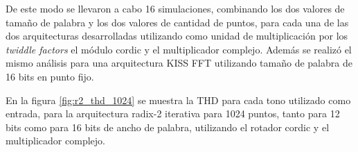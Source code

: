 De este modo se llevaron a cabo 16 simulaciones, combinando los dos valores de tamaño de palabra y
los dos valores de cantidad de puntos, para cada una de las dos arquitecturas desarrolladas
utilizando como unidad de multiplicación por los \textit{twiddle factors} el módulo cordic y el
multiplicador complejo. Además se realizó el mismo análisis para una arquitectura KISS FFT utilizando tamaño de
palabra de 16 bits en punto fijo.
% 
% 

En la figura \ref{fig:r2_thd_1024} se muestra la THD para cada tono utilizado como
entrada, para la arquitectura radix-2 iterativa para 1024 puntos, tanto para 12 bits como para 16 bits de
ancho de palabra, utilizando el rotador cordic y el multiplicador complejo.

